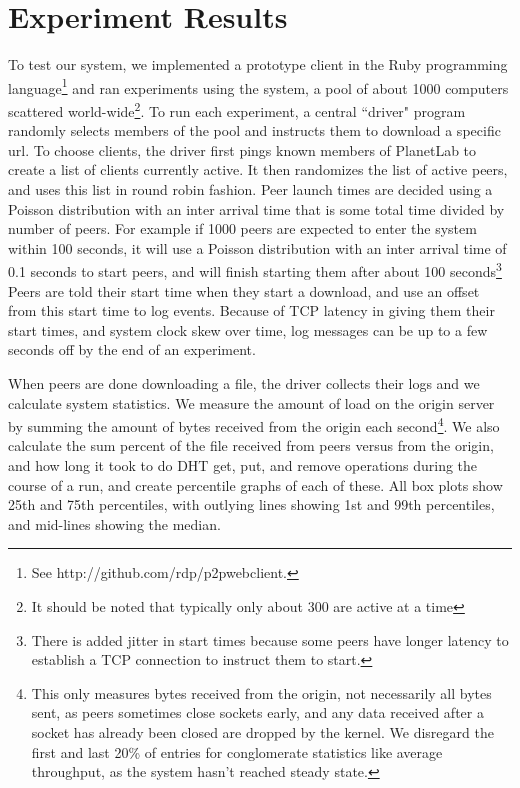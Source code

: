 
\section{Experiment Results}

To test our system, we implemented a prototype client in the Ruby programming language\footnote{See http://github.com/rdp/p2pwebclient.} and 
ran experiments using the system, a pool of about 1000 computers scattered world-wide\footnote{It should be noted
that typically only about 300 are active at a time}.
To run each experiment, a central ``driver" program randomly selects members of the pool and instructs them to download a specific url.  To
choose clients, the driver first pings known members of PlanetLab to create a list of clients currently active.  It then randomizes the list of active peers,
and uses this list in round robin fashion. Peer launch times are decided using a Poisson distribution with an inter arrival time that is some total time 
divided by number of peers.  For example if 1000 peers are expected to enter the system within 100 seconds, it will use a Poisson distribution with 
an inter arrival time of 0.1 seconds to start peers, and will finish 
starting them after about 100 seconds\footnote{There is added jitter in start times because some peers have longer latency to establish a TCP connection
to instruct them to start.}  Peers are told their start time when they start a download, 
and use an offset from this start time to log events.  Because of TCP latency in giving them their start times, and system clock skew over time, 
log messages can be up to a few seconds off by the end of an experiment.

When peers are done downloading a file, the driver collects their logs and we calculate system statistics.  We measure 
the amount of load on the origin server by summing the amount of 
bytes received from the origin each second\footnote{This only measures bytes received from the origin, not necessarily all bytes sent, 
as peers sometimes close sockets early, and any data received after a socket has already been closed are dropped by the kernel.  
We disregard the first and last 20\% of entries for conglomerate statistics like average throughput, as the system hasn't reached steady state.}.
We also calculate the sum percent of the file received from peers versus from the origin, and how long it took to do DHT 
get, put, and remove operations during the course of a run, and create percentile graphs of each of these.  
All box plots show 25th and 75th percentiles, with outlying lines showing 1st and 99th percentiles, and mid-lines showing the median.

